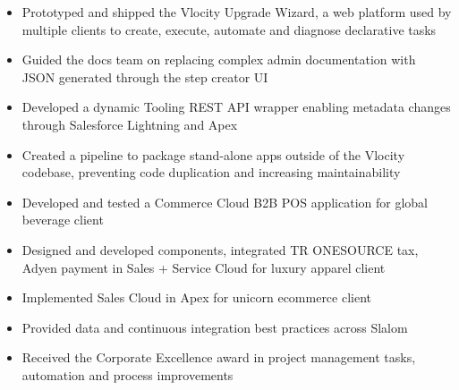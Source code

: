 \documentclass[10pt,a4paper,ragged2e]{altacv}
\begin{document}
\divider

\begin{itemize}
\item Prototyped and shipped the Vlocity Upgrade Wizard, a web platform used by multiple clients to create, execute, automate and diagnose declarative tasks
\item Guided the docs team on replacing complex admin documentation with JSON generated through the step creator UI
\item Developed a dynamic Tooling REST API wrapper enabling metadata changes through Salesforce Lightning and Apex
\item Created a pipeline to package stand-alone apps outside of the Vlocity codebase, preventing code duplication and increasing maintainability
\end{itemize}

\divider

\begin{itemize}
\item Developed and tested a Commerce Cloud B2B POS application for global beverage client
\item Designed and developed components, integrated TR ONESOURCE tax, Adyen payment in Sales + Service Cloud for luxury apparel client
\item Implemented Sales Cloud in Apex for unicorn ecommerce client
\item Provided data and continuous integration best practices across Slalom
\end{itemize}

\divider

\begin{itemize}
\item Received the Corporate Excellence award in project management tasks, automation and process improvements
\end{itemize}

\divider



\end{document}
